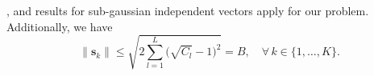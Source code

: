 , and results for sub-gaussian independent vectors apply for our problem. Additionally, we have
\begin{equation}
\|\bm{s}_k\|\leq \sqrt{2\sum_{l=1}^L \big(\sqrt{C_l}-1\big)^2} = B,\quad\forall\,k\in\{1,\ldots,K\}.
\end{equation}


%


